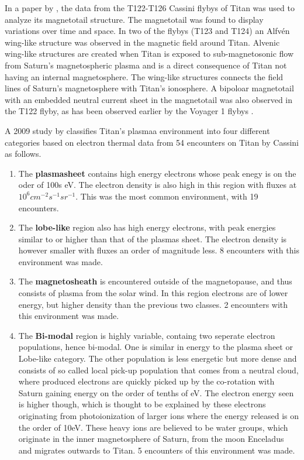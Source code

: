 \documentclass[12pt, parskip=full*, abstract]{scrartcl}
\begin{document}
In a paper by \textcite{alfven-wing-structure}, the data from the T122-T126 Cassini flybys of Titan was used to analyze its magnetotail structure. The magnetotail was found to display variations over time and space. In two of the flybys (T123 and T124) an Alfvén wing-like structure was observed in the magnetic field around Titan. Alvenic wing-like structures are created when Titan is exposed to sub-magnetosonic flow from Saturn's magnetospheric plasma and is a direct consequence of Titan not having an internal magnetosphere. The wing-like structures connects the field lines of Saturn's magnetosphere with Titan's ionosphere. A bipoloar magnetotail with an embedded neutral current sheet in the magnetotail was also observed in the T122 flyby, as has been observed earlier by the Voyager 1 flybys \parencite{ness-1982}.


A 2009 study by \textcite{Rymer-class} classifies Titan's plasmaa environment into four different categories based on electron thermal data from 54 encounters on Titan by Cassini as follows. 

\begin{enumerate}
	\item The \textbf{plasmasheet} contains high energy electrons whose peak enegy is on the oder of 100s eV. The electron density is also high in this region with fluxes at $10^6cm^{-2}s^{-1}sr^{-1}$. This was the most common environment, with 19 encounters.
	\item The \textbf{lobe-like} region also has high energy electrons, with peak energies similar to or higher than that of the plasmas sheet. The electron density is however smaller with fluxes an order of magnitude less. 8 encounters with this environment was made.
	\item The \textbf{magnetosheath} is encountered outside of the magnetopause, and thus consists of plasma from the solar wind. In this region electrons are of lower energy, but higher density than the previous two classes. 2 encounters with this environment was made.
	\item The \textbf{Bi-modal} region is highly variable, containg two seperate electron populations, hence bi-modal. One is similar in energy to the plasma sheet or Lobe-like category. The other population is less energetic but more dense and consists of so called local pick-up population that comes from a neutral cloud, where produced electrons are quickly picked up by the co-rotation with Saturn gaining energy on the order of tenths of eV. The electron energy seen is higher though, which is thought to be explained by these electrons originating from photoionization of larger ions where the energy released is on the order of 10eV. These heavy ions are believed to be water groups, which originate in the inner magnetosphere of Saturn, from the moon Enceladus and migrates outwards to Titan. 5 encounters of this environment was made.

\end{enumerate}
\end{document}
